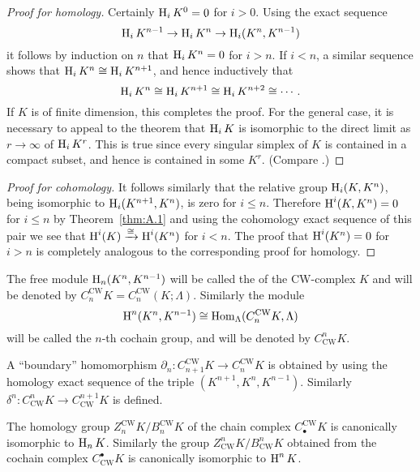 \documentclass[../main]{subfiles}
\begin{document}
\begin{proof}[Proof for homology]
Certainly $\operatorname{H}_i K^0 = 0$ for $i>0$. Using the exact sequence \[\operatorname{H}_i K^{n-1} \rightarrow \operatorname{H}_i K^n \rightarrow \operatorname{H}_i (K^n, K^{n-1})\] it follows by induction on $n$ that $\operatorname{H}_i K^n = 0$ for $i>n$. If $i<n$, a similar sequence shows that $\operatorname{H}_i K^n \cong \operatorname{H}_i K^{n+1}$, and hence inductively that \[\operatorname{H}_i K^n \cong \operatorname{H}_i K^{n+1} \cong \operatorname{H}_i K^{n+2} \cong \cdots .\] If $K$ is of finite dimension, this completes the proof. For the general case, it is necessary to appeal to the theorem that $\operatorname{H}_i K$ is isomorphic to the direct limit as $r\rightarrow \infty$ of $\operatorname{H}_i K^r$. This is true since every singular simplex of $K$ is contained in a compact subset, and hence is contained in some $K^r$. (Compare \newline \cite[Section 5(D)]{whitehead1961}.)
\end{proof}
\begin{proof}[Proof for cohomology]
It follows similarly that the relative group $\operatorname{H}_i (K, K^n)$, being isomorphic to $\operatorname{H}_i (K^{n+1}, K^n)$, is zero for $i \leq n$. Therefore $\operatorname{H}^i (K, K^n)= 0$ for $i \leq n$ by Theorem~\ref{thm:A.1} and using the cohomology exact sequence of this pair we see that $\operatorname{H}^i (K) \xrightarrow{\cong} \operatorname{H}^i (K^n)$ for $i<n$. The proof that $\operatorname{H}^i (K^n)=0$ for $i>n$ is completely analogous to the corresponding proof for homology.
\end{proof}
\begin{definition}
The free module $\operatorname{H}_n (K^n, K^{n-1})$ will be called the  of the CW-complex $K$ and will be denoted by $C^{\mathrm{CW}}_n K = C^{\mathrm{CW}}_n (K; \Lambda)$. Similarly the module \[\operatorname{H}^n (K^n, K^{n-1}) \cong \operatorname{Hom}_{\Lambda} (C^{\mathrm{CW}}_n K, \Lambda)\] will be called the $n$-th cochain group, and will be denoted by $C_{\mathrm{CW}}^n K$.
\end{definition}
A ``boundary'' homomorphism $\partial_n : C^{\mathrm{CW}}_{n+1} K \rightarrow C^{\mathrm{CW}}_{n} K$ is obtained by using the homology exact sequence of the triple $(K^{n+1} , K^n, K^{n-1})$. Similarly\newline ${\delta}^n: C_{\mathrm{CW}}^n K \rightarrow C_{\mathrm{CW}}^{n+1} K$ is defined.
\begin{theorem}
The homology group $Z^{\mathrm{CW}}_n K / B^{\mathrm{CW}}_n K$ of the chain complex $C^{\mathrm{CW}}_{\bullet} K$ is canonically isomorphic to $\operatorname{H}_n K$. Similarly the group $Z_{\mathrm{CW}}^n K / B_{\mathrm{CW}}^n K$ obtained from the cochain complex $C_{\mathrm{CW}}^{\bullet} K$ is canonically isomorphic to $\operatorname{H}^n K$.
\end{theorem} 
\end{document}
